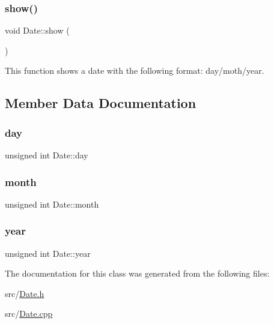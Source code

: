 \subsubsection{\texorpdfstring{show()}{show()}}
{\footnotesize\ttfamily void Date\+::show (\begin{DoxyParamCaption}{ }\end{DoxyParamCaption})}

This function shows a date with the following format\+: day/moth/year. 

\subsection{Member Data Documentation}
\hypertarget{classDate_a6c498dee79268960e000ec3deaa555ac}{}\label{classDate_a6c498dee79268960e000ec3deaa555ac} 
\subsubsection{\texorpdfstring{day}{day}}
{\footnotesize\ttfamily unsigned int Date\+::day\hspace{0.3cm}{\ttfamily [private]}}

\hypertarget{classDate_af48402007169fe01234fe9bb9e7a1d2c}{}\label{classDate_af48402007169fe01234fe9bb9e7a1d2c} 
\subsubsection{\texorpdfstring{month}{month}}
{\footnotesize\ttfamily unsigned int Date\+::month\hspace{0.3cm}{\ttfamily [private]}}

\hypertarget{classDate_afc014a1ae62e56be473144050201e62a}{}\label{classDate_afc014a1ae62e56be473144050201e62a} 
\subsubsection{\texorpdfstring{year}{year}}
{\footnotesize\ttfamily unsigned int Date\+::year\hspace{0.3cm}{\ttfamily [private]}}



The documentation for this class was generated from the following files\+:\begin{DoxyCompactItemize}
\item 
src/\hyperlink{Date_8h}{Date.\+h}\item 
src/\hyperlink{Date_8cpp}{Date.\+cpp}\end{DoxyCompactItemize}
